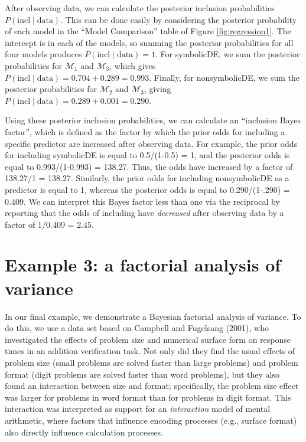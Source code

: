 \documentclass[english,,doc,floatsintext]{apa6}
\begin{document}
After observing data, we can calculate the posterior inclusion probabilities \(P(\text{incl}\mid \text{data})\). This can be done easily by considering the posterior probability of each model in the ``Model Comparison'' table of Figure \ref{fig:regression1}. The intercept is in each of the models, so summing the posterior probabilities for all four models produces \(P(\text{incl}\mid \text{data}) = 1\). For symbolicDE, we sum the posterior probabilities for \(\mathcal{M}_{1}\) and \(\mathcal{M}_{3}\), which gives \(P(\text{incl}\mid \text{data}) = 0.704 + 0.289 = 0.993\). Finally, for nonsymbolicDE, we sum the posterior probabilities for \(\mathcal{M}_{2}\) and \(\mathcal{M}_{3}\), giving \(P(\text{incl}\mid \text{data}) = 0.289 + 0.001 = 0.290\).

Using these posterior inclusion probabilities, we can calculate an ``inclusion Bayes factor'', which is defined as the factor by which the prior odds for including a specific predictor are increased after observing data. For example, the prior odds for including symbolicDE is equal to 0.5/(1-0.5) = 1, and the posterior odds is equal to 0.993/(1-0.993) = 138.27. Thus, the odds have increased by a factor of 138.27/1 = 138.27. Similarly, the prior odds for including nonsymbolicDE as a predictor is equal to 1, whereas the posterior odds is equal to 0.290/(1-.290) = 0.409. We can interpret this Bayes factor less than one via the reciprocal by reporting that the odds of including have \emph{decreased} after observing data by a factor of 1/0.409 = 2.45.

\hypertarget{example-3-a-factorial-analysis-of-variance}{%
\section{Example 3: a factorial analysis of variance}\label{example-3-a-factorial-analysis-of-variance}}

In our final example, we demonstrate a Bayesian factorial analysis of variance. To do this, we use a data set based on Campbell and Fugelsang (2001), who investigated the effects of problem size and numerical surface form on response times in an addition verification task. Not only did they find the usual effects of problem size (small problems are solved faster than large problems) and problem format (digit problems are solved faster than word problems), but they also found an interaction between size and format; specifically, the problem size effect was larger for problems in word format than for problems in digit format. This interaction was interpreted as support for an \emph{interaction} model of mental arithmetic, where factors that influence encoding processes (e.g., surface format) also directly influence calculation processes.
\end{document}

